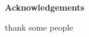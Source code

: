\thispagestyle{empty}
\begin{center}
	\textbf{\Large{Acknowledgements}}
\end{center}

thank some people

\clearpage
